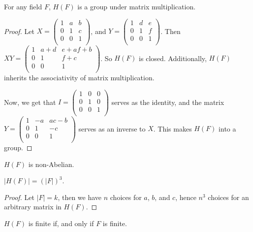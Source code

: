 \begin{proposition}\label{proposition_1.4.4}
  For any field $F$,  $H(F)$ is a group under matrix multiplication.
\end{proposition}
\begin{proof}
  Let $X=\begin{pmatrix}
    1   &   a   &   b   \\
    0   &   1   &   c   \\
    0   &   0   &   1   \\
  \end{pmatrix}$, and
  $Y=\begin{pmatrix}
    1   &   d   &   e   \\
    0   &   1   &   f   \\
    0   &   0   &   1   \\
  \end{pmatrix}$. Then
  $XY=\begin{pmatrix}
    1   &  a+d  &   e+af+b  \\
    0   &   1   &   f+c     \\
    0   &   0   &   1   \\
  \end{pmatrix}$.
  So $H(F)$ is closed. Additionally, $H(F)$ inherits the associativity of
  matrix multiplication.

  Now, we get that $I=\begin{pmatrix}
    1    &   0   &   0   \\
    0    &   1   &   0   \\
    0    &   0   &   1   \\
  \end{pmatrix}$
  serves as the identity, and the matrix $Y=\begin{pmatrix}
    1   &  -a   &   ac-b    \\
    0   &   1   &   -c      \\
    0   &   0   &   1       \\
  \end{pmatrix}$
  serves as an inverse to $X$. This makes  $H(F)$ into a group.
\end{proof}
\begin{corollary}
  $H(F)$ is non-Abelian.
\end{corollary}
\begin{corollary}
  $|H(F)|=(|F|)^3$.
\end{corollary}
\begin{proof}
  Let $|F|=k$, then we have $n$ choices for  $a$,  $b$, and  $c$, hence
  $n^3$ choices for an arbitrary matrix in  $H(F)$.
\end{proof}
\begin{corollary}
  $H(F)$ is finite if, and only if $F$ is finite.
\end{corollary}
